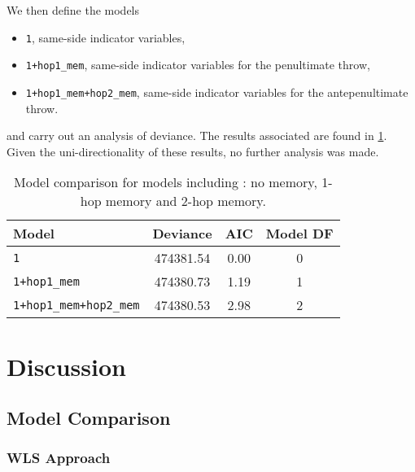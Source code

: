 \documentclass[a4paper, 12pt,oneside]{article}
\begin{document}
		We then define the models 
		\begin{itemize}
			\item \texttt{1}, same-side indicator variables,
			\item \texttt{1+hop1\_mem}, same-side indicator variables for the penultimate throw,
			\item \texttt{1+hop1\_mem+hop2\_mem}, same-side indicator variables for the antepenultimate throw.
		\end{itemize}
		and carry out an analysis of deviance. The results associated are found in \ref{tab:memory-model-comparison}. Given the uni-directionality of these results, no further analysis was made.  
		\begin{table}[htb]
			\centering
			\caption{Model comparison for models including : no memory, 1-hop memory and 2-hop memory.}
			\label{tab:memory-model-comparison}
			\begin{tabular}{lccc}
			\toprule
			Model & Deviance & AIC & Model DF \\
			\midrule
			\texttt{1} & 474381.54 & 0.00 & 0 \\
			\texttt{1+hop1\_mem} & 474380.73 & 1.19 & 1 \\
			\texttt{1+hop1\_mem+hop2\_mem} & 474380.53 & 2.98 & 2 \\
			\bottomrule
			\end{tabular}
		\end{table}
	\section{Discussion}
		\subsection{Model Comparison}
		\subsubsection{WLS Approach}
\end{document}
